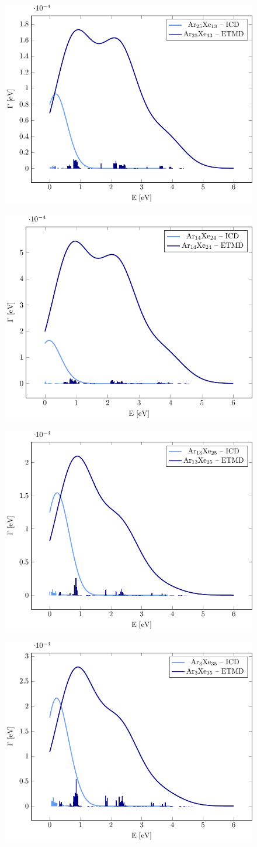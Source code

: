 \begin{figure}
 \centering
 \includegraphics[width=0.5\columnwidth]{pics/Ar25Xe13.pdf}
 \caption{}
 \label{}
\end{figure}

\begin{figure}
 \centering
 \includegraphics[width=0.5\columnwidth]{pics/Ar14Xe24.pdf}
 \caption{}
 \label{figure:}
\end{figure}

\begin{figure}
 \centering
 \includegraphics[width=0.5\columnwidth]{pics/Ar13Xe25.pdf}
 \caption{}
 \label{figure:Ar13Xe25}
\end{figure}

\begin{figure}
 \centering
 \includegraphics[width=0.5\columnwidth]{pics/Ar3Xe35.pdf}
 \caption{}
 \label{figure:Ar3Xe35}
\end{figure}

%
